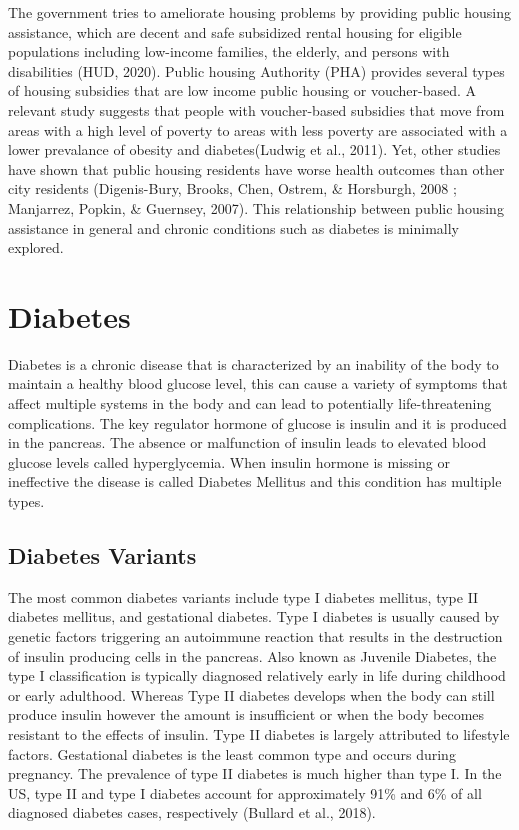 \documentclass [11pt, proquest] {uwthesis}[2015/03/03]
\begin{document}
The government tries to ameliorate housing problems by providing public
housing assistance, which are decent and safe subsidized rental housing
for eligible populations including low-income families, the elderly, and
persons with disabilities (HUD, 2020). Public housing Authority (PHA)
provides several types of housing subsidies that are low income public
housing or voucher-based. A relevant study suggests that people with
voucher-based subsidies that move from areas with a high level of
poverty to areas with less poverty are associated with a lower
prevalance of obesity and diabetes(Ludwig et al., 2011). Yet, other
studies have shown that public housing residents have worse health
outcomes than other city residents (Digenis-Bury, Brooks, Chen, Ostrem,
\& Horsburgh, 2008 ; Manjarrez, Popkin, \& Guernsey, 2007). This
relationship between public housing assistance in general and chronic
conditions such as diabetes is minimally explored.

\section{Diabetes}\label{diabetes}

Diabetes is a chronic disease that is characterized by an inability of
the body to maintain a healthy blood glucose level, this can cause a
variety of symptoms that affect multiple systems in the body and can
lead to potentially life-threatening complications. The key regulator
hormone of glucose is insulin and it is produced in the pancreas. The
absence or malfunction of insulin leads to elevated blood glucose levels
called hyperglycemia. When insulin hormone is missing or ineffective the
disease is called Diabetes Mellitus and this condition has multiple
types.

\subsection{Diabetes Variants}\label{diabetes-variants}

The most common diabetes variants include type I diabetes mellitus, type
II diabetes mellitus, and gestational diabetes. Type I diabetes is
usually caused by genetic factors triggering an autoimmune reaction that
results in the destruction of insulin producing cells in the pancreas.
Also known as Juvenile Diabetes, the type I classification is typically
diagnosed relatively early in life during childhood or early adulthood.
Whereas Type II diabetes develops when the body can still produce
insulin however the amount is insufficient or when the body becomes
resistant to the effects of insulin. Type II diabetes is largely
attributed to lifestyle factors. Gestational diabetes is the least
common type and occurs during pregnancy. The prevalence of type II
diabetes is much higher than type I. In the US, type II and type I
diabetes account for approximately 91\% and 6\% of all diagnosed
diabetes cases, respectively (Bullard et al., 2018).
\end{document}
